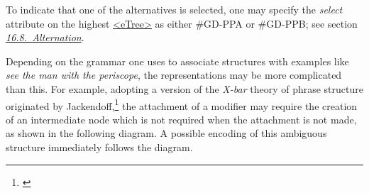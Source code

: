 To indicate that one of the alternatives is selected, one may specify the {\itshape select} attribute on the highest \hyperref[TEI.eTree]{<eTree>} as either \#GD-PPA or \#GD-PPB; see section \textit{\hyperref[SAAT]{16.8.\ Alternation}}.\par
Depending on the grammar one uses to associate structures with examples like \textit{see the man with the periscope}, the representations may be more complicated than this. For example, adopting a version of the \textit{X-bar} theory of phrase structure originated by Jackendoff,\footnote{\cite{GD-BIBL-2}} the attachment of a modifier may require the creation of an intermediate node which is not required when the attachment is not made, as shown in the following diagram. A possible encoding of this ambiguous structure immediately follows the diagram.\par
